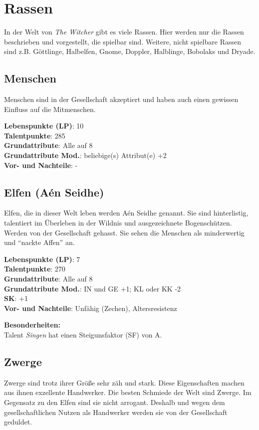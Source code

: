 \newpage
{\let\clearpage\relax\chapter{Rassen}}
In der Welt von \textit{The Witcher} gibt es viele Rassen. Hier werden nur die Rassen beschrieben und vorgestellt, die spielbar sind. Weitere, nicht spielbare Rassen sind z.B. Göttlinge, Halbelfen, Gnome, Doppler, Halblinge, Bobolaks und Dryade.

\section{Menschen}
Menschen sind in der Gesellschaft akzeptiert und haben auch einen gewissen Einfluss auf die Mitmenschen.

\textbf{Lebenspunkte (LP)}: 10 \\
\textbf{Talentpunkte}: 285 \\
\textbf{Grundattribute}: Alle auf 8 \\
\textbf{Grundattribute Mod.}: beliebige(s) Attribut(e) +2  \\
\textbf{Vor- und Nachteile}: - 

\section{Elfen (Aén Seidhe)}
Elfen, die in dieser Welt leben werden Aén Seidhe genannt. Sie sind hinterlistig, talentiert im Überleben in der Wildnis und ausgezeichnete Bogenschützen. Werden von der Gesellschaft gehasst. Sie sehen die Menschen als minderwertig und "`nackte Affen"' an.

\textbf{Lebenspunkte (LP)}: 7 \\
\textbf{Talentpunkte}: 270 \\
\textbf{Grundattribute}: Alle auf 8 \\
\textbf{Grundattribute Mod.}: IN und GE +1; KL oder KK -2 \\
\textbf{SK}: +1 \\
\textbf{Vor- und Nachteile}: Unfähig (Zechen), Altersresistenz

\textbf{Besonderheiten:} \\
Talent \textit{Singen} hat einen Steigunsfaktor (SF) von A.

\section{Zwerge}
Zwerge sind trotz ihrer Größe sehr zäh und stark. Diese Eigenschaften machen aus ihnen exzellente Handwerker. Die besten Schmiede der Welt sind Zwerge. Im Gegensatz zu den Elfen sind sie nicht arrogant. Deshalb und wegen dem gesellschaftlichen Nutzen als Handwerker werden sie von der Gesellschaft geduldet.

